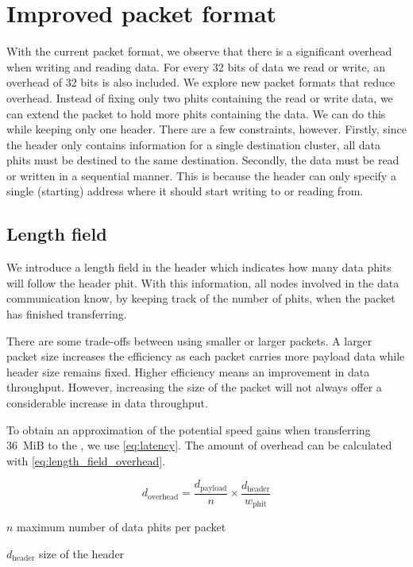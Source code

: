 \section{Improved packet format}
With the current packet format, we observe that there is a significant overhead when writing and reading data.
For every 32 bits of data we read or write, an overhead of 32 bits is also included.
We explore new packet formats that reduce overhead.
Instead of fixing only two phits containing the read or write data, we can extend the packet to hold more phits containing the data.
We can do this while keeping only one header.
There are a few constraints, however.
Firstly, since the header only contains information for a single destination cluster, all data phits must be destined to the same destination.
Secondly, the data must be read or written in a sequential manner.
This is because the header can only specify a single (starting) address where it should start writing to or reading from.

\subsection{Length field}
We introduce a length field in the header which indicates how many data phits will follow the header phit.
With this information, all nodes involved in the data communication know, by keeping track of the number of phits, when the packet has finished transferring. 

There are some trade-offs between using smaller or larger packets.
A larger packet size increases the efficiency as each packet carries more payload data while header size remains fixed.
Higher efficiency means an improvement in data throughput.
However, increasing the size of the packet will not always offer a considerable increase in data throughput.

To obtain an approximation of the potential speed gains when transferring \SI{36}{MiB} to the \graicore{}, we use \cref{eq:latency}.
The amount of overhead can be calculated with \cref{eq:length_field_overhead}.

\begin{equation}
    d_{\text{overhead}} = \frac{d_{\text{payload}}}{n} \times \frac{d_{\text{header}}}{w_{\text{phit}}}
\label{eq:length_field_overhead}
\end{equation}

\begin{eqexpl}[15mm]
    \item{$n$} maximum number of data phits per packet
    \item{$d_{\text{header}}$} size of the header
\end{eqexpl}

